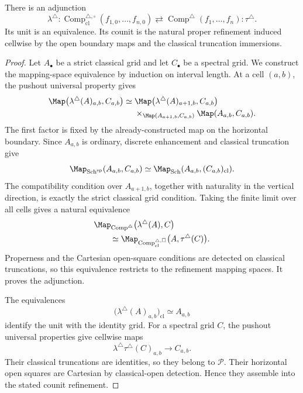 \begin{proposition}
\label{prop:finite-grid-lifting-adjunction}
There is an adjunction
\[
    \lambda^\triangle:
    \operatorname{Comp}^{\triangle,\square}_{\mathrm{cl}}
    (f_{1,0},\ldots,f_{n,0})
    \rightleftarrows
    \operatorname{Comp}^{\triangle}(f_1,\ldots,f_n):
    \tau^\triangle.
\]
Its unit is an equivalence.  Its counit is the natural proper refinement
induced cellwise by the open boundary maps and the classical truncation
immersions.
\end{proposition}

\begin{proof}
Let \(A_\bullet\) be a strict classical grid and let \(C_\bullet\) be a
spectral grid.  We construct the mapping-space equivalence by induction on
interval length.  At a cell \((a,b)\), the pushout universal property gives
\[
\begin{aligned}
    \Map
    \bigl(
      \lambda^\triangle(A)_{a,b},
      C_{a,b}
    \bigr)
    \simeq{}
    &\Map
    \bigl(
      \lambda^\triangle(A)_{a+1,b},
      C_{a,b}
    \bigr)
    \\
    &\times_{
      \Map(A_{a+1,b},C_{a,b})
    }
    \Map(A_{a,b},C_{a,b}).
\end{aligned}
\]
The first factor is fixed by the already-constructed map on the horizontal
boundary.  Since \(A_{a,b}\) is ordinary, discrete enhancement and classical
truncation give
\[
    \Map_{\operatorname{Sch}^{\mathrm{sp}}}
    (A_{a,b},C_{a,b})
    \simeq
    \Map_{\operatorname{Sch}}
    (A_{a,b},(C_{a,b})_{\mathrm{cl}}).
\]
The compatibility condition over \(A_{a+1,b}\), together with naturality in
the vertical direction, is exactly the strict classical grid condition.
Taking the finite limit over all cells gives a natural equivalence
\[
\begin{aligned}
    &\Map_{\operatorname{Comp}^{\triangle}}
    \bigl(
      \lambda^\triangle(A),
      C
    \bigr) \\
    &\qquad\simeq
    \Map_{\operatorname{Comp}^{\triangle,\square}_{\mathrm{cl}}}
    \bigl(
      A,
      \tau^\triangle(C)
    \bigr).
\end{aligned}
\]
Properness and the Cartesian open-square conditions are detected on
classical truncations, so this equivalence restricts to the refinement
mapping spaces.  It proves the adjunction.

The equivalences
\[
    \bigl(
      \lambda^\triangle(A)_{a,b}
    \bigr)_{\mathrm{cl}}
    \simeq
    A_{a,b}
\]
identify the unit with the identity grid.  For a spectral grid \(C\), the
pushout universal properties give cellwise maps
\[
    \lambda^\triangle\tau^\triangle(C)_{a,b}
    \longrightarrow
    C_{a,b}.
\]
Their classical truncations are identities, so they belong to
\(\mathcal P\).  Their horizontal open squares are Cartesian by
classical-open detection.  Hence they assemble into the stated counit
refinement.
\end{proof}

